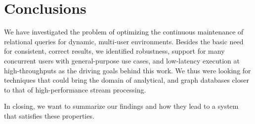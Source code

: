 \documentclass{article}
\begin{document}
\section{Conclusions} \label{conclusions}

We have investigated the problem of optimizing the continuous
maintenance of relational queries for dynamic, multi-user
environments. Besides the basic need for consistent, correct results,
we identified robustness, support for many concurrent users with
general-purpose use cases, and low-latency execution at
high-throughputs as the driving goals behind this work. We thus were
looking for techniques that could bring the domain of analytical, and
graph databases closer to that of high-performance stream processing.

In closing, we want to summarize our findings and how they lead to a
system that satisfies these properties.
\end{document}
